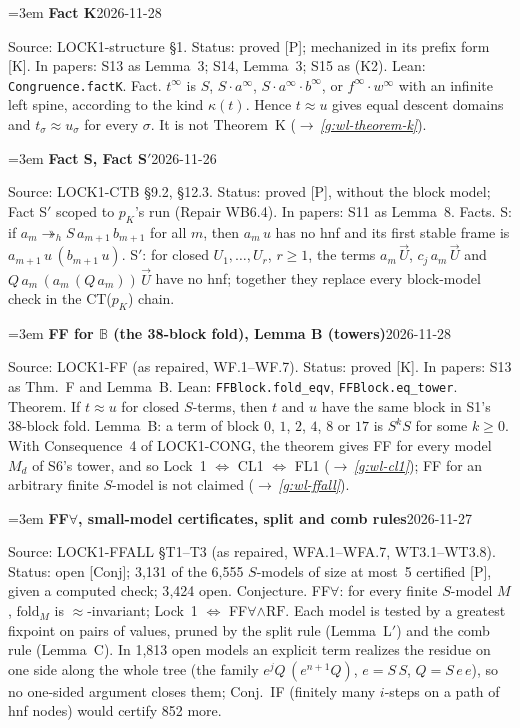 \documentclass[11pt]{amsart}
\makeatletter
\newcommand{\hred}{\twoheadrightarrow_h}
\newcounter{sense}
\newenvironment{entry}[3]{%
  \par\addvspace{\medskipamount}\noindent\phantomsection
  \def\@currentlabel{#2}\label{#1}\setcounter{sense}{0}\raggedright\emergencystretch=3em%
  \textbf{#2}\hfill{\footnotesize\textsf{#3}}\par\nopagebreak\noindent\ignorespaces}%
  {\par}
\newcommand{\src}[1]{\textsf{Source:} #1.\enskip}
\newcommand{\lean}[1]{\textsf{Lean:} #1.\enskip}
\newcommand{\status}[1]{\textsf{Status:} #1.\enskip}
\newcommand{\appears}[1]{\textsf{In papers:} #1.\enskip}
\renewcommand{\see}[1]{$\rightarrow$\,\emph{\ref{#1}}}
\makeatother
\begin{document}
\begin{entry}{g:wl-fact-k}{Fact K}{2026-11-28}
\src{LOCK1-structure \S1}
\status{proved [P]; mechanized in its prefix form [K]}
\appears{S13 as Lemma~3; S14, Lemma~3; S15 as (K2)}
\lean{\texttt{Congruence.factK}}
Fact. $t^\infty$ is $S$, $S\cdot a^\infty$, $S\cdot a^\infty\cdot b^\infty$, or $f^\infty\cdot w^\infty$
with an infinite left spine, according to the kind $\kappa(t)$. Hence $t\approx u$ gives equal descent
domains and $t_\sigma\approx u_\sigma$ for every $\sigma$. It is not Theorem~K (\see{g:wl-theorem-k}).
\end{entry}

\begin{entry}{g:wl-fact-s}{Fact S, Fact S$'$}{2026-11-26}
\src{LOCK1-CTB \S9.2, \S12.3}
\status{proved [P], without the block model; Fact S$'$ scoped to $p_K$'s run (Repair WB6.4)}
\appears{S11 as Lemma~8}
Facts. S: if $a_m\hred S\,a_{m+1}\,b_{m+1}$ for all $m$, then $a_m\,u$ has no hnf and its first stable
frame is $a_{m+1}\,u\,(b_{m+1}\,u)$. S$'$: for closed $U_1,\dots,U_r$, $r\ge1$, the terms $a_m\,\vec U$,
$c_j\,a_m\,\vec U$ and $Q\,a_m\,(a_m\,(Q\,a_m))\,\vec U$ have no hnf; together they replace every
block-model check in the CT($p_K$) chain.
\end{entry}

\begin{entry}{g:wl-ff-block}{FF for $\mathbb B$ (the 38-block fold), Lemma B (towers)}{2026-11-28}
\src{LOCK1-FF (as repaired, WF.1--WF.7)}
\status{proved [K]}
\appears{S13 as Thm.~F and Lemma~B}
\lean{\texttt{FFBlock.fold\_eqv}, \texttt{FFBlock.eq\_tower}}
Theorem. If $t\approx u$ for closed $S$-terms, then $t$ and $u$ have the same block in S1's 38-block fold.
Lemma~B: a term of block $0$, $1$, $2$, $4$, $8$ or $17$ is $S^kS$ for some $k\ge0$. With Consequence~4 of
LOCK1-CONG, the theorem gives FF for every model $M_d$ of S6's tower, and so Lock~1 $\Leftrightarrow$ CL1
$\Leftrightarrow$ FL1 (\see{g:wl-cl1}); FF for an arbitrary finite $S$-model is not claimed (\see{g:wl-ffall}).
\end{entry}

\begin{entry}{g:wl-ffall}{FF$\forall$, small-model certificates, split and comb rules}{2026-11-27}
\src{LOCK1-FFALL \S T1--T3 (as repaired, WFA.1--WFA.7, WT3.1--WT3.8)}
\status{open [Conj]; 3{,}131 of the 6{,}555 $S$-models of size at most~5 certified [P], given a computed check; 3{,}424 open}
Conjecture. FF$\forall$: for every finite $S$-model $M$, $\mathrm{fold}_M$ is $\approx$-invariant; Lock~1
$\Leftrightarrow$ FF$\forall\wedge\mathrm{RF}$. Each model is tested by a greatest fixpoint on pairs of values,
pruned by the split rule (Lemma~L$'$) and the comb rule (Lemma~C). In 1{,}813 open models an explicit term
realizes the residue on one side along the whole tree (the family $e^jQ\,(e^{n+1}Q)$, $e=S\,S$, $Q=S\,e\,e$),
so no one-sided argument closes them; Conj.~IF (finitely many $i$-steps on a path of hnf nodes) would certify
852 more.
\end{entry}
\end{document}
